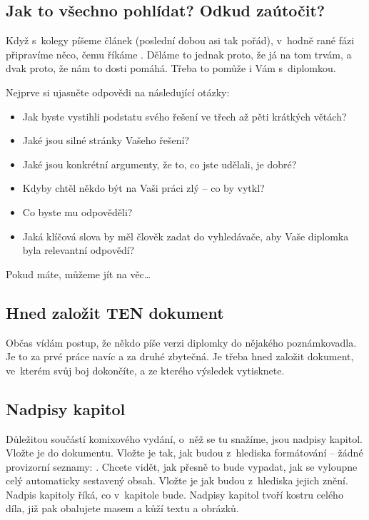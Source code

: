 \subsection*{Jak to všechno pohlídat? Odkud zaútočit?}
Když s~kolegy píšeme článek (poslední dobou asi tak pořád), v~hodně rané fázi připravíme něco, čemu říkáme . Děláme to jednak proto, že já na tom trvám, a dvak proto, že nám to dosti pomáhá. Třeba to pomůže i Vám s~diplomkou.

Nejprve si ujasněte odpovědi na následující otázky:
\begin{itemize}
  \item{Jak byste vystihli podstatu svého řešení ve třech až pěti krátkých větách?}
  \item{Jaké jsou silné stránky Vašeho řešení?}
  \item{Jaké jsou konkrétní argumenty, že to, co jste udělali, je dobré?}
  \item{Kdyby chtěl někdo být na Vaši práci zlý -- co by vytkl?}
  \item{Co byste mu odpověděli?}
  \item{Jaká klíčová slova by měl člověk zadat do vyhledávače, aby Vaše diplomka byla relevantní odpovědí?}
\end{itemize}

Pokud máte, můžeme jít na věc\ldots

\subsection*{Hned založit TEN dokument}
Občas vídám postup, že někdo píše  verzi diplomky do nějakého poznámkovadla. Je to za prvé práce navíc a za druhé zbytečná. Je třeba hned založit dokument, ve~kterém svůj boj dokončíte, a ze kterého výsledek vytisknete.

\subsection*{Nadpisy kapitol}
Důležitou součástí komixového vydání, o~něž se tu snažíme, jsou nadpisy kapitol. Vložte je do dokumentu. Vložte je tak, jak budou z~hlediska formátování -- žádné provizorní seznamy: . Chcete vidět, jak přesně to bude vypadat, jak se vyloupne celý automaticky sestavený obsah. Vložte je jak budou z~hlediska jejich znění. Nadpis kapitoly říká, co v~kapitole bude. Nadpisy kapitol tvoří kostru celého díla, již pak obalujete masem a kůží textu a obrázků.

